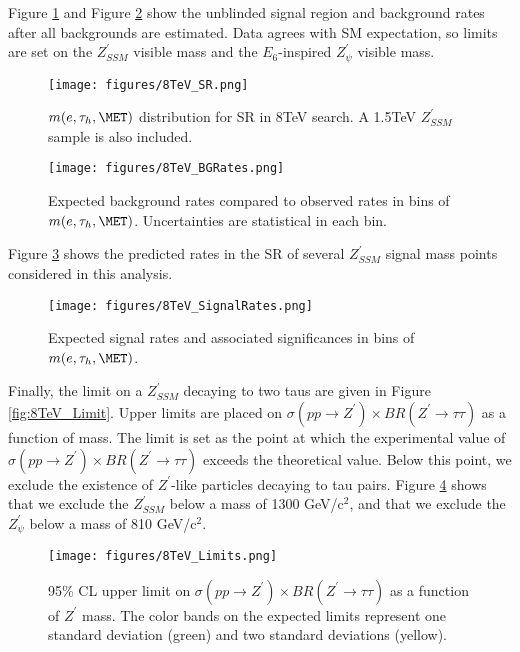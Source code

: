 Figure \ref{fig:8TeV_SR} and Figure \ref{fig:8TeV_BGRates} show the unblinded signal region and background rates after all backgrounds are estimated. Data agrees with SM expectation, so limits are set on the $Z^{\prime}_{SSM}$ visible mass and the $E_6$-inspired $Z^{\prime}_{\psi}$ visible mass.

\begin{figure}[tbh!]
\centering
\texttt{[image: figures/8TeV\_SR.png]}
\caption{$m(e,\tau_{h},\MET)$ distribution for SR in 8TeV search. A 1.5TeV $Z^{\prime}_{SSM}$ sample is also included.}
\label{fig:8TeV_SR}
\end{figure}

\begin{figure}[tbh!]
\centering
\texttt{[image: figures/8TeV\_BGRates.png]}
\caption{Expected background rates compared to observed rates in bins of $m(e,\tau_{h},\MET)$. Uncertainties are statistical in each bin.}
\label{fig:8TeV_BGRates}
\end{figure}

Figure \ref{fig:8TeV_SignalRates} shows the predicted rates in the SR of several $Z^{\prime}_{SSM}$ signal mass points considered in this analysis.

\begin{figure}[tbh!]
\centering
\texttt{[image: figures/8TeV\_SignalRates.png]}
\caption{Expected signal rates and associated significances in bins of $m(e,\tau_{h},\MET)$. }
\label{fig:8TeV_SignalRates}
\end{figure}

Finally, the limit on a $Z^{\prime}_{SSM}$ decaying to two taus are given in Figure \ref{fig:8TeV_Limit}. Upper limits are placed on $\sigma\left(pp\to Z^{\prime}\right)\times BR\left(Z^{\prime}\to\tau\tau\right)$ as a function of mass. The limit is set as the point at which the experimental value of $\sigma\left(pp\to Z^{\prime}\right)\times BR\left(Z^{\prime}\to\tau\tau\right)$ exceeds the theoretical value. Below this point, we exclude the existence of $Z^{\prime}$-like particles decaying to tau pairs. Figure \ref{fig:8TeV_Limits} shows that we exclude the $Z^{\prime}_{SSM}$ below a mass of 1300 GeV/c$^2$, and that we exclude the $Z^{\prime}_{\psi}$ below a mass of 810 GeV/c$^2$.

\begin{figure}[tbh!]
\centering
\texttt{[image: figures/8TeV\_Limits.png]}
\caption{95\% CL upper limit on $\sigma\left(pp\to Z^{\prime}\right)\times BR\left(Z^{\prime}\to\tau\tau\right)$ 
as a function of $Z^{\prime}$ mass. The color bands on the expected limits represent one standard deviation (green) and two standard deviations (yellow).}
\label{fig:8TeV_Limits}
\end{figure}
